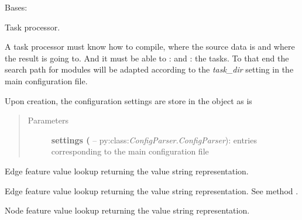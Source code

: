 \documentclass[letterpaper,10pt,english]{sphinxmanual}
\begin{document}

\begin{fulllineitems}
\label{graf/graf:graf.GrafTask}
Bases: {\hyperref[graf/graf:graf.graf.Graf]{}}

Task processor.

A task processor must know how to compile, where the source data is and where the result is going to.
And it must be able to \href{http://docs.python.org/reference/simple\_stmts.html\#import}{}: and \href{http://docs.python.org/library/functions.html\#reload}{}: the tasks.
To that end the search path for modules will be adapted according to the \emph{task\_dir} setting
in the main configuration file.

Upon creation, the configuration settings are store in the object as is
\begin{quote}\begin{description}
\item[{Parameters}] \leavevmode
\textbf{settings (} --
py:class:\emph{ConfigParser.ConfigParser}): entries corresponding to the main configuration file

\end{description}\end{quote}

\begin{fulllineitems}
\label{graf/graf:graf.GrafTask.FEi}
Edge feature value lookup returning the value string representation.

\end{fulllineitems}


\begin{fulllineitems}
\label{graf/graf:graf.GrafTask.FEr}
Edge feature value lookup returning the value string representation.
See method {\hyperref[graf/graf:graf.GrafTask.FEi]{}}.

\end{fulllineitems}


\begin{fulllineitems}
\label{graf/graf:graf.GrafTask.FNi}
Node feature value lookup returning the value string representation.


\end{fulllineitems}
\end{fulllineitems}
\end{document}
